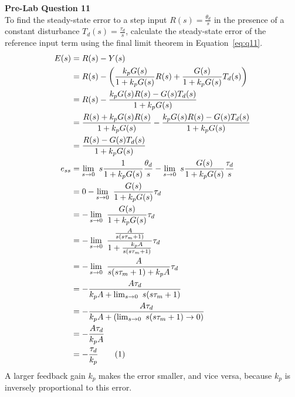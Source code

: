 \documentclass[12pt]{article}
\begin{document}
\textbf{Pre-Lab Question 11} \\
To find the steady-state error to a step input $R(s) = \frac{\theta_d}{s}$ in the presence of a constant disturbance $T_d(s) = \frac{\tau_d}{s}$, calculate the steady-state error of the reference input term using the final limit theorem in Equation~\ref{eq:q11}.
\begin{align*}
    E(s) &= R(s) - Y(s) \\
    &= R(s) - \left(\frac{k_pG(s)}{1 + k_pG(s)}R(s) + \frac{G(s)}{1 + k_pG(s)}T_d(s) \right) \\
    &= R(s) - \frac{k_pG(s)R(s) - G(s)T_d(s)}{1 + k_pG(s)} \\
    &= \frac{R(s) + k_pG(s)R(s)}{1 + k_pG(s)} - \frac{k_pG(s)R(s) - G(s)T_d(s)}{1 + k_pG(s)} \\
    &= \frac{R(s) - G(s)T_d(s)}{1 + k_pG(s)} \\
    e_{ss} &= \lim_{s \to 0} \ s \frac{1}{1 + k_pG(s)} \frac{\theta_d}{s} - \lim_{s \to 0} \ s \frac{G(s)}{1 + k_pG(s)} \frac{\tau_d}{s} \\
    &= 0 - \lim_{s \to 0} \ \frac{G(s)}{1 + k_pG(s)} \tau_d \\
    &= - \lim_{s \to 0} \ \frac{G(s)}{1 + k_pG(s)} \tau_d \\
    &= - \lim_{s \to 0} \ \frac{\frac{A}{s(s\tau_m + 1)}}{1 + \frac{k_pA}{s(s\tau_m + 1)}} \tau_d \\
    &= - \lim_{s \to 0} \ \frac{A}{s(s\tau_m + 1) + k_pA} \tau_d \\
    &= - \frac{A\tau_d}{k_pA + \lim_{s \to 0} \ s(s\tau_m + 1)} \\
    &= - \frac{A\tau_d}{k_pA + (\lim_{s \to 0} \ s(s\tau_m + 1) \to 0)} \\
    &= - \frac{A\tau_d}{k_pA} \\
    &= - \frac{\tau_d}{k_p} \stepcounter{equation}\tag{\theequation}\label{eq:q11}
\end{align*}
A larger feedback gain $k_p$ makes the error smaller, and vice versa, because $k_p$ is inversely proportional to this error.

\setcounter{section}{5}
\end{document}
